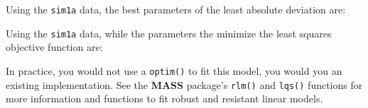 \documentclass[]{book}
\newenvironment{Shaded}{\begin{snugshade}}{\end{snugshade}}
\newcommand{\CommentTok}[1]{\textcolor[rgb]{0.56,0.35,0.01}{\textit{#1}}}
\newcommand{\ControlFlowTok}[1]{\textcolor[rgb]{0.13,0.29,0.53}{\textbf{#1}}}
\newcommand{\DataTypeTok}[1]{\textcolor[rgb]{0.13,0.29,0.53}{#1}}
\newcommand{\DecValTok}[1]{\textcolor[rgb]{0.00,0.00,0.81}{#1}}
\newcommand{\KeywordTok}[1]{\textcolor[rgb]{0.13,0.29,0.53}{\textbf{#1}}}
\newcommand{\NormalTok}[1]{#1}
\newcommand{\OperatorTok}[1]{\textcolor[rgb]{0.81,0.36,0.00}{\textbf{#1}}}
\newcommand{\StringTok}[1]{\textcolor[rgb]{0.31,0.60,0.02}{#1}}
\theoremstyle{plain}
\theoremstyle{remark}
\begin{document}
\begin{Shaded}
\end{Shaded}

Using the \texttt{sim1a} data, the best parameters of the least absolute deviation are:

\begin{Shaded}
\end{Shaded}

Using the \texttt{sim1a} data, while the parameters the minimize the least squares objective function are:

\begin{Shaded}
\end{Shaded}

In practice, you would not use a \texttt{optim()} to fit this model, you would you an existing implementation.
See the \textbf{MASS} package's \texttt{rlm()} and \texttt{lqs()} functions for more information and functions to fit robust and resistant linear models.
\end{document}
